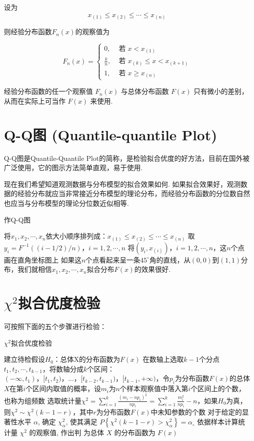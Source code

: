 设为
$$
x_{(1)} \leq x_{(2)} \leq \cdots \leq x_{(n)}
$$

则经验分布函数$F_{n}(x)$的观察值为

$$
F_{n}(x)=\left\{\begin{array}{ll}
0, & \text { 若 } x<x_{(1)} \\
\frac{k}{n}, & \text { 若 } x_{(k)} \leq x<x_{(k+1)} \\
1, & \text { 若 } x \geq x_{(n)}
\end{array}\right.
$$

经验分布函数的任一个观察值 $F_n(x)$ 与总体分布函数 $F(x)$ 只有微小的差别，从而在实际上可当作 $F(x)$ 来使用. 

\section{Q-Q图 (Quantile-quantile Plot)}

Q-Q图是Quantile-Quantile Plot的简称，是检验拟合优度的好方法，目前在国外被广泛使用，它的图示方法简单直观，易于使用. 

现在我们希望知道观测数据与分布模型的拟合效果如何. 如果拟合效果好，观测数据的经验分布就应当非常接近分布模型的理论分布，而经验分布函数的分位数自然也应当与分布模型的理论分位数近似相等. 

\begin{algorithm}
    \caption{作Q-Q图}
    
将$x_1,x_2,\cdots,x_n$依大小顺序排列成：$x_{(1)}\le x_{(2)}\le\cdots\le x_{(n)}$\;
取$y_i=F^{-1}((i-1/2)/n)，i=1,2,\cdots,n$\;
将$(y_i,x_{(i)})，i=1,2,\cdots,n$，这$n$个点画在直角坐标图上\;
如果这$n$个点看起来呈一条$45^\circ$角的直线，从$(0,0)$到$(1,1)$分布，我们就相信$x_1,x_2,\cdots,x_n$拟合分布$F(x)$的效果很好. 
\end{algorithm}

\section{$\chi^2$拟合优度检验}

可按照下面的五个步骤进行检验：

\begin{algorithm}
\caption{$\chi^2$拟合优度检验}
建立待检假设$H_0$：总体X的分布函数为$F(x)$\;
在数轴上选取$k-1$个分点$t_1,t_2,\cdots,t_{k-1}$，将数轴分成$k$个区间：$(-\infty,t_1)，[t_1,t_2)，…，[t_{k-2},t_{k-1})，[t_{k-1},+\infty)$，令$p_i$为分布函数$F(x)$的总体$X$在第$i$个区间内取值的概率，设$m_i$为$n$个样本观察值中落入第$i$个区间上的个数，也称为组频数\;
选取统计量$\chi^2=\sum_{i=1}^{k}\frac{(m_i-np_i)^2}{np_i}=\sum_{i=1}^{k}{\frac{m_i^2}{np_i}-n}$，如果$H_0$为真，则$\chi^2 \sim \chi^2(k-1-r)$，其中$r$为分布函数$F(x)$中未知参数的个数\;
对于给定的显著性水平 \( \alpha \), 确定 \( \chi_{\alpha}^{2} \), 使其满足 \( P\left\{\chi^{2}(k-1-r)>\chi_{\alpha}^{2}\right\}=\alpha_{\circ} \) \;
依据样本计算统计量 \( \chi^{2} \) 的观察值, 作出判
为总体 \( X \) 的分布函数为 \( F(x) \) \;
\end{algorithm}

